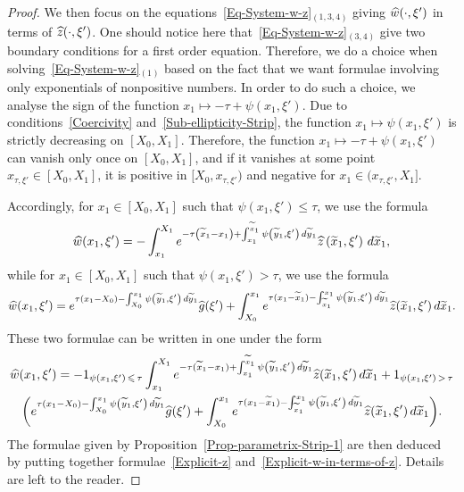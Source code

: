 \documentclass[AHL,Unicode,longabstracts]{cedram}
\renewcommand{\leq}{\leqslant}
\renewcommand{\tilde}{\widetilde}
\renewcommand{\hat}{\widehat}
\let\oldtilde\tilde
\renewcommand*{\tilde}[1]{\mathchoice{\widetilde{#1}}{\widetilde{#1}}{\oldtilde{#1}}{\oldtilde{#1}}}
\let\oldhat\hat
\renewcommand*{\hat}[1]{\mathchoice{\widehat{#1}}{\widehat{#1}}{\oldhat{#1}}{\oldhat{#1}}}
\begin{document}
\begin{proof}
We then focus on the equations~\eqref{Eq-System-w-z}$_{(1,3,4)}$ giving $\hat w(\cdot, \xi')$ in terms of $\hat z(\cdot, \xi')$. One should notice here that~\eqref{Eq-System-w-z}$_{(3,4)}$ give two boundary conditions for a first order equation. Therefore, we do a choice when solving~\eqref{Eq-System-w-z}$_{(1)}$ based on the fact that we want formulae involving only exponentials of nonpositive numbers. In order to do such a choice, we analyse the sign of the function $ x_1 \mapsto - \tau + \psi(x_1, \xi') $. Due to conditions~\eqref{Coercivity} and~\eqref{Sub-ellipticity-Strip}, the function $x_1 \mapsto \psi(x_1, \xi')$ is strictly decreasing on $[X_0, X_1]$. Therefore, the function $ x_1 \mapsto - \tau + \psi(x_1, \xi') $ can vanish only once on $[X_0, X_1]$, and if it vanishes at some point $x_{\tau,\xi'} \in [X_0,X_1]$, it is positive in $[X_0, x_{\tau,\xi'})$ and negative for $x_1 \in (x_{\tau,\xi'}, X_1]$.

Accordingly, for $x_1 \in [X_0, X_1]$ such that $\psi(x_1, \xi') \leq \tau$, we use the formula
\begin{equation*}
\widehat{w}(x_1, \xi') = -\int_{x_1}^{X_1} e^{-\tau\left(\tilde{x}_1-x_1\right)+\int_{x_1}^{\tilde{x}_1} \psi\left(\tilde{y}_1,\xi'\right) \, d \tilde{y}_1} \widehat{z}\left(\tilde{x}_1, \xi'\right) \, d \tilde{x}_1,
\end{equation*}
while for $x_1 \in [X_0, X_1]$ such that $\psi(x_1, \xi') >\tau$, we use the formula
\begin{equation*}
\widehat{w}(x_1, \xi') = e^{\tau(x_1-X_0)- \int_{X_0}^{x_1} \psi\left(\tilde{y}_1, \xi'\right) \, d \tilde{y}_1 } \widehat{g}(\xi') +
\int_{X_0}^{x_1} e^{\tau(x_1-\tilde{x}_1) - \int_{\tilde{x}_1}^{x_1} \psi\left(\tilde{y}_1,\xi'\right) \, d \tilde{y}_1} \widehat{z}(\tilde{x}_1, \xi') \, d \tilde{x}_1.
\end{equation*}
These two formulae can be written in one under the form
\begin{multline}\label{Explicit-w-in-terms-of-z}
\hat w(x_1, \xi') = - 1_{\psi(x_1, \xi')\, \leq \,\tau} \int_{x_1}^{X_1} e^{-\tau(\tilde{x}_1-x_1)+\int_{x_1}^{\tilde{x}_1} \psi\left(\tilde{y}_1,\xi'\right) \, d \tilde{y}_1} \widehat{z}(\tilde{x}_1, \xi') \, d \tilde{x}_1
+ 1_{\psi(x_1,\xi')\, >\,\tau}
\\
 \left(e^{\tau(x_1-X_0)- \int_{X_0}^{x_1} \psi\left(\tilde{y}_1, \xi'\right) \, d \tilde{y}_1 } \widehat{g}(\xi') +
\int_{X_0}^{x_1} e^{\tau(x_1-\tilde{x}_1) - \int_{\tilde{x}_1}^{x_1} \psi\left(\tilde{y}_1,\xi'\right) \, d \tilde{y}_1} \widehat{z}(\tilde{x}_1, \xi') \, d \tilde{x}_1 \right)\!.
\end{multline}
The formulae given by Proposition~\ref{Prop-parametrix-Strip-1} are then deduced by putting together formulae~\eqref{Explicit-z} and~\eqref{Explicit-w-in-terms-of-z}. Details are left to the reader.
\end{proof}
\end{document}

